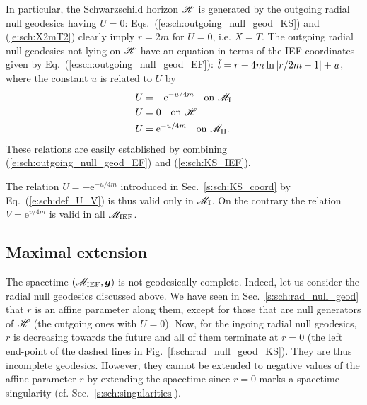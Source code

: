 In particular, the Schwarzschild horizon $\mathscr{H}$ is generated by the
outgoing radial null geodesics having $U=0$:
Eqs.~(\ref{e:sch:outgoing_null_geod_KS}) and (\ref{e:sch:X2mT2})
clearly imply $r=2m$ for $U=0$, i.e. $X=T$.
 The outgoing radial null geodesics not lying on $\mathscr{H}$ have an equation
in terms of the IEF coordinates given by
Eq.~(\ref{e:sch:outgoing_null_geod_EF}):
${\tilde t} = r + 4 m \ln \left|r/2m- 1 \right| + u$,
where the constant $u$ is related to $U$ by
\begin{subequations}
\begin{align}
 & U = - \mathrm{e}^{-u/4m} \quad \mbox{on}\ \mathscr{M}_{\rm I} \\
 & U = 0 \quad \mbox{on}\ \mathscr{H} \\
 & U =  \mathrm{e}^{-u/4m} \quad \mbox{on}\ \mathscr{M}_{\rm II} .
\end{align}
\end{subequations}
These relations are easily established by combining
(\ref{e:sch:outgoing_null_geod_EF}) and (\ref{e:sch:KS_IEF}).


\begin{remark}
The relation $U = - \mathrm{e}^{-u/4m}$ introduced in Sec.~\ref{s:sch:KS_coord}
by Eq.~(\ref{e:sch:def_U_V}) is thus valid only in $\mathscr{M}_{\rm I}$. On the
contrary the relation $V = \mathrm{e}^{v/4m}$ is valid in all $\mathscr{M}_{\rm IEF}$.
\end{remark}

\subsection{Maximal extension} \label{s:sch:max_extens}

The spacetime $(\mathscr{M}_{\rm IEF}, \bm{g})$ is not geodesically complete.
Indeed, let us consider the radial null geodesics discussed above.
We have seen in Sec.~\ref{s:sch:rad_null_geod} that $r$ is an affine parameter
along them, except for those that are null generators of $\mathscr{H}$
(the outgoing ones with $U=0$).
Now, for the ingoing radial null geodesics, $r$ is decreasing towards the
future and all of them terminate at $r=0$ (the left end-point of the dashed
lines in Fig.~\ref{f:sch:rad_null_geod_KS}).
They are thus incomplete geodesics. However, they cannot be extended to
negative values of the affine parameter $r$ by extending the spacetime
since $r=0$ marks a spacetime singularity (cf. Sec.~\ref{s:sch:singularities}).

